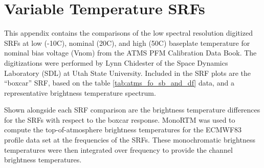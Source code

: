 \section{Variable Temperature SRFs}
\label{app:Tset}
This appendix contains the comparisons of the low spectral resolution digitized SRFs at low (-10\textdegree{}C), nominal (20\textdegree{}C), and high (50\textdegree{}C) baseplate temperature for nominal bias voltage (Vnom) from the ATMS PFM Calibration Data Book\cite{ATMS_PFM_CalLog}. The digitizations were performed by Lynn Chidester of the Space Dynamics Laboratory (SDL) at Utah State University. Included in the SRF plots are the ``boxcar'' SRF, based on the table \ref{tab:atms_fo_sb_and_df} data, and a representative brightness temperature spectrum.

Shown alongside each SRF comparison are the brightness temperature differences for the SRFs with respect to the boxcar response. MonoRTM \cite{Clough_2005} was used to compute the top-of-atmosphere brightness temperatures for the ECMWF83 profile data set \cite{ECMWF_profile_set2,Matricardi_ECMWF564} at the frequencies of the SRFs. These monochromatic brightness temperatures were then integrated over frequency to provide the channel brightness temperatures.

\newpage

